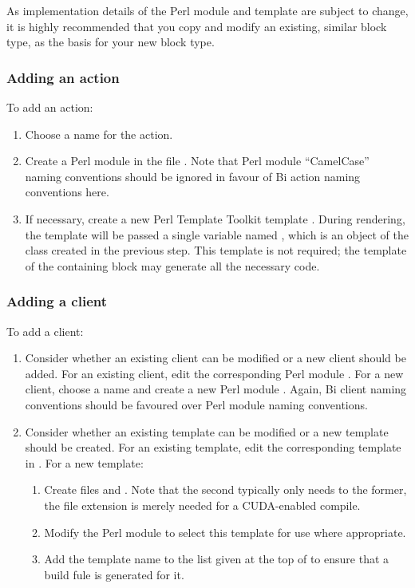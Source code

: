 As implementation details of the Perl module and template are subject to
change, it is highly recommended that you copy and modify an existing, similar
block type, as the basis for your new block type.

\subsubsection{Adding an action}

To add an action:
\begin{enumerate}
\item Choose a name for the action.
\item Create a Perl module  in the
  file . Note that Perl module
  ``CamelCase'' naming conventions should be ignored in favour of Bi action
  naming conventions here.
\item If necessary, create a new Perl Template Toolkit template
  . During rendering, the
  template will be passed a single variable named , which is an
  object of the class created in the previous step. This template is
  not required; the template of the containing block may generate all the
  necessary code.
\end{enumerate}

\subsubsection{Adding a client\label{Adding_a_client}}

To add a client:
\begin{enumerate}
\item Consider whether an existing client can be modified or a new client
  should be added. For an existing client, edit the corresponding Perl module
  . For a new client, choose a name
  and create a new Perl module . Again,
  Bi client naming conventions should be favoured over Perl module naming
  conventions.
\item Consider whether an existing template can be modified or a new template
  should be created. For an existing template, edit the corresponding template
  in . For a new template:
\begin{enumerate}
\item Create files  and
  . Note that the second
  typically only needs to  the former, the 
  file extension is merely needed for a CUDA-enabled compile.
\item Modify the Perl module to select this template for use where
  appropriate.
\item Add the template name to the list given at the top of
   to ensure that a build fule is generated
  for it.
\end{enumerate}
\end{enumerate}


